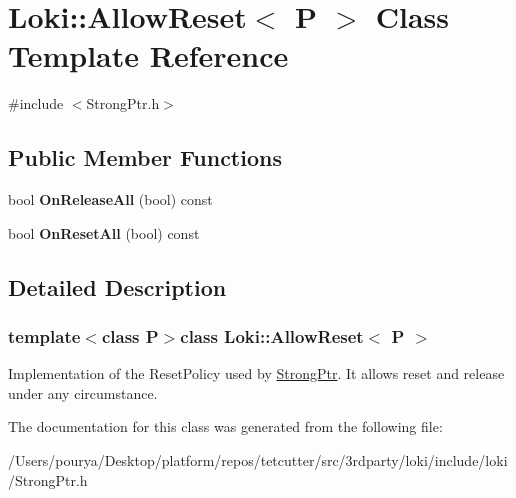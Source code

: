 \hypertarget{structLoki_1_1AllowReset}{}\section{Loki\+:\+:Allow\+Reset$<$ P $>$ Class Template Reference}
\label{structLoki_1_1AllowReset}


{\ttfamily \#include $<$Strong\+Ptr.\+h$>$}

\subsection*{Public Member Functions}
\begin{DoxyCompactItemize}
\item 
\hypertarget{structLoki_1_1AllowReset_a90abd64e4c1d435423187588ef0f7071}{}bool {\bfseries On\+Release\+All} (bool) const \label{structLoki_1_1AllowReset_a90abd64e4c1d435423187588ef0f7071}

\item 
\hypertarget{structLoki_1_1AllowReset_abd0fb42d572e46bf87a3f177349e8db6}{}bool {\bfseries On\+Reset\+All} (bool) const \label{structLoki_1_1AllowReset_abd0fb42d572e46bf87a3f177349e8db6}

\end{DoxyCompactItemize}


\subsection{Detailed Description}
\subsubsection*{template$<$class P$>$class Loki\+::\+Allow\+Reset$<$ P $>$}

Implementation of the Reset\+Policy used by \hyperlink{classLoki_1_1StrongPtr}{Strong\+Ptr}. It allows reset and release under any circumstance. 

The documentation for this class was generated from the following file\+:\begin{DoxyCompactItemize}
\item 
/\+Users/pourya/\+Desktop/platform/repos/tetcutter/src/3rdparty/loki/include/loki/Strong\+Ptr.\+h\end{DoxyCompactItemize}
